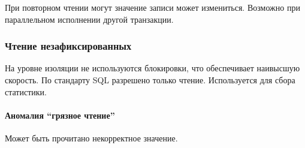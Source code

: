 При повторном чтении могут значение записи может измениться. Возможно при параллельном исполнении
другой транзакции.

\subsubsection{Чтение незафиксированных}

На уровне изоляции не используются блокировки, что обеспечивает наивысшую скорость. По стандарту
SQL разрешено только чтение. Используется для сбора статистики.

\paragraph{Аномалия ``грязное чтение''}

Может быть прочитано некорректное значение.
